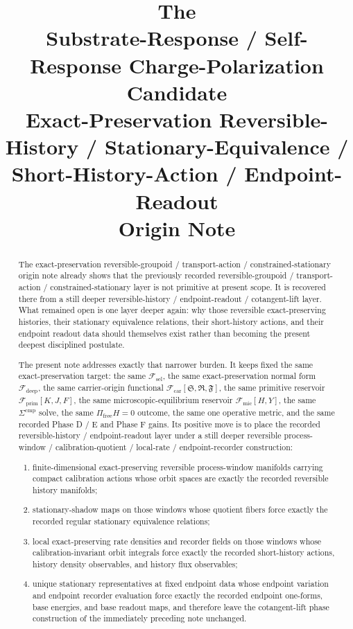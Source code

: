 \documentclass[11pt]{article}
\title{\textbf{The \TheoryName{}}\\[0.4em]
\large Substrate-Response / Self-Response Charge-Polarization Candidate\\
\large Exact-Preservation Reversible-History / Stationary-Equivalence / Short-History-Action / Endpoint-Readout\\
\large Origin Note}
\author{}
\date{}
\newcommand{\GaugeAux}{Y}
\newcommand{\MicFunctional}{\mathscr F_{\mathrm{mic}}}
\newcommand{\PrimFunctional}{\mathscr F_{\mathrm{prim}}}
\newcommand{\CarrierFunctional}{\mathscr F_{\mathrm{car}}}
\newcommand{\DeepFunctional}{\mathscr F_{\mathrm{deep}}}
\newcommand{\StemFunctional}{\mathscr F_{\mathrm{sel}}}
\newcommand{\PrimStrain}{K}
\newcommand{\PrimNeutral}{J}
\newcommand{\PrimFree}{F}
\newcommand{\CarrierSeed}{\mathfrak S}
\newcommand{\RelabelSeed}{\mathfrak R}
\newcommand{\FreeSeed}{\mathfrak F}
\begin{document}
\maketitle

\begin{abstract}
The exact-preservation reversible-groupoid / transport-action / constrained-stationary origin note already shows that the previously recorded reversible-groupoid / transport-action / constrained-stationary layer is not primitive at present scope. It is recovered there from a still deeper reversible-history / endpoint-readout / cotangent-lift layer. What remained open is one layer deeper again: why those reversible exact-preserving histories, their stationary equivalence relations, their short-history actions, and their endpoint readout data should themselves exist rather than becoming the present deepest disciplined postulate.

The present note addresses exactly that narrower burden. It keeps fixed the same exact-preservation target: the same \(\StemFunctional\), the same exact-preservation normal form \(\DeepFunctional\), the same carrier-origin functional \(\CarrierFunctional[\CarrierSeed,\RelabelSeed,\FreeSeed]\), the same primitive reservoir \(\PrimFunctional[\PrimStrain,\PrimNeutral,\PrimFree]\), the same microscopic-equilibrium reservoir \(\MicFunctional[H,\GaugeAux]\), the same \(\Sigma^{\mathrm{cmp}}\) solve, the same \(\Pi_{\mathrm{free}}H=0\) outcome, the same one operative metric, and the same recorded Phase D / E and Phase F gains. Its positive move is to place the recorded reversible-history / endpoint-readout layer under a still deeper reversible process-window / calibration-quotient / local-rate / endpoint-recorder construction:
\begin{enumerate}
    \item finite-dimensional exact-preserving reversible process-window manifolds carrying compact calibration actions whose orbit spaces are exactly the recorded reversible history manifolds;
    \item stationary-shadow maps on those windows whose quotient fibers force exactly the recorded regular stationary equivalence relations;
    \item local exact-preserving rate densities and recorder fields on those windows whose calibration-invariant orbit integrals force exactly the recorded short-history actions, history density observables, and history flux observables;
    \item unique stationary representatives at fixed endpoint data whose endpoint variation and endpoint recorder evaluation force exactly the recorded endpoint one-forms, base energies, and base readout maps, and therefore leave the cotangent-lift phase construction of the immediately preceding note unchanged.
\end{enumerate}


\end{abstract}
\end{document}
